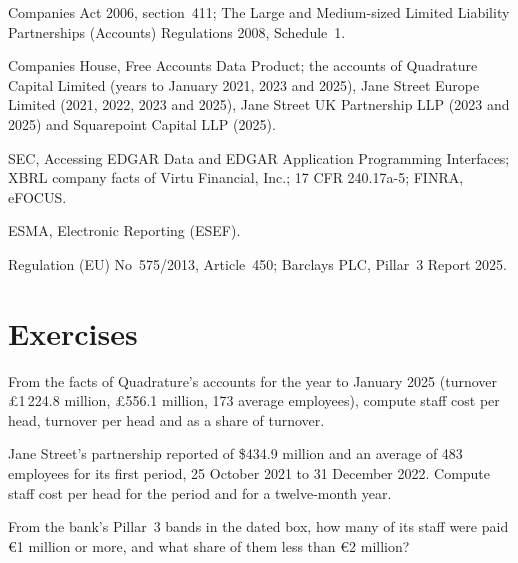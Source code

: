 \begin{omsources}
\item Companies Act 2006, section~411; The Large and Medium-sized Limited Liability Partnerships (Accounts)
Regulations 2008, Schedule~1.
\item Companies House, Free Accounts Data Product; the accounts of Quadrature Capital Limited (years to January 2021,
2023 and 2025), Jane Street Europe Limited (2021, 2022, 2023 and 2025), Jane Street UK Partnership LLP (2023 and 2025)
and Squarepoint Capital LLP (2025).
\item SEC, Accessing EDGAR Data and EDGAR Application Programming Interfaces; XBRL company facts of Virtu Financial,
Inc.; 17 CFR 240.17a-5; FINRA, eFOCUS.
\item ESMA, Electronic Reporting (ESEF).
\item Regulation (EU) No~575/2013, Article~450; Barclays PLC, Pillar~3 Report 2025.
\end{omsources}

\section{Exercises}

\begin{exercise}[$\star$]\label{exo:in:reading-a-trading-firms-accounts:1}
From the facts of Quadrature's accounts for the year to January 2025 (turnover \pounds1\,224.8 million, 
\pounds556.1 million, 173 average employees), compute staff cost per head, turnover per head and  as a share of
turnover.
\end{exercise}

\begin{exercise}[$\star$]\label{exo:in:reading-a-trading-firms-accounts:2}
Jane Street's partnership reported  of \$434.9 million and an average of 483 employees for its first
period, 25 October 2021 to 31 December 2022. Compute staff cost per head for the period and for a twelve-month year.
\end{exercise}

\begin{exercise}[$\star$]\label{exo:in:reading-a-trading-firms-accounts:3}
From the bank's Pillar~3 bands in the dated box, how many of its staff were paid \euro1 million or more, and what share of
them less than \euro2 million?
\end{exercise}

